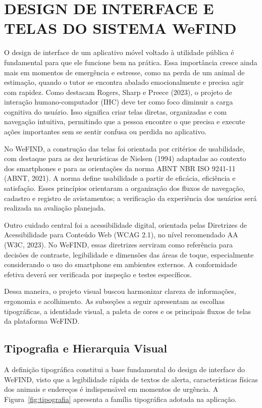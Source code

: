 \section{DESIGN DE INTERFACE E TELAS DO SISTEMA WeFIND}

O design de interface de um aplicativo móvel voltado à utilidade pública é fundamental para que ele funcione bem na prática. Essa importância cresce ainda mais em momentos de emergência e estresse, como na perda de um animal de estimação, quando o tutor se encontra abalado emocionalmente e precisa agir com rapidez. Como destacam Rogers, Sharp e Preece (2023), o projeto de interação humano-computador (IHC) deve ter como foco diminuir a carga cognitiva do usuário. Isso significa criar telas diretas, organizadas e com navegação intuitiva, permitindo que a pessoa encontre o que precisa e execute ações importantes sem se sentir confusa ou perdida no aplicativo.

No WeFIND, a construção das telas foi orientada por critérios de usabilidade, com destaque para as dez heurísticas de Nielsen (1994) adaptadas ao contexto dos smartphones e para as orientações da norma ABNT NBR ISO 9241-11 (ABNT, 2021). A norma define usabilidade a partir de eficácia, eficiência e satisfação. Esses princípios orientaram a organização dos fluxos de navegação, cadastro e registro de avistamentos; a verificação da experiência dos usuários será realizada na avaliação planejada.

Outro cuidado central foi a acessibilidade digital, orientada pelas Diretrizes de Acessibilidade para Conteúdo Web (WCAG 2.1), no nível recomendado AA (W3C, 2023). No WeFIND, essas diretrizes serviram como referência para decisões de contraste, legibilidade e dimensões das áreas de toque, especialmente considerando o uso do smartphone em ambientes externos. A conformidade efetiva deverá ser verificada por inspeção e testes específicos.

Dessa maneira, o projeto visual buscou harmonizar clareza de informações, ergonomia e acolhimento. As subseções a seguir apresentam as escolhas tipográficas, a identidade visual, a paleta de cores e os principais fluxos de telas da plataforma WeFIND.


\subsection{Tipografia e Hierarquia Visual}

A definição tipográfica constitui a base fundamental do design de interface do WeFIND, visto que a legibilidade rápida de textos de alerta, características físicas dos animais e endereços é indispensável em momentos de urgência. A Figura~\ref{fig:tipografia} apresenta a família tipográfica adotada na aplicação.

